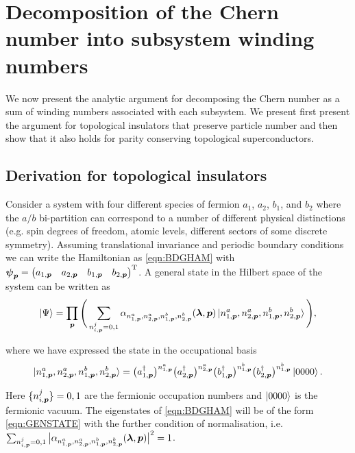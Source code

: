 \section{Decomposition of the Chern number into subsystem winding numbers}

We now present the analytic argument for decomposing the Chern number as a sum of winding numbers associated with each subsystem. We present first present the argument for topological insulators that preserve particle number and then show that it also holds for parity conserving topological superconductors.

\subsection{Derivation for topological insulators}

Consider a system with four different species of fermion $a_{1}$, $a_{2}$, $b_{1}$, and $b_{2}$ where the $a/b$ bi-partition can correspond to a number of different physical distinctions (e.g. spin degrees of freedom, atomic levels, different sectors of some discrete symmetry). Assuming translational invariance and periodic boundary conditions we can write the Hamiltonian as \eqref{eqn:BDGHAM} with $\boldsymbol{\psi}_{\boldsymbol{p}}=\begin{pmatrix} a_{1,\boldsymbol{p}} & a_{2,\boldsymbol{p}} & b_{1,\boldsymbol{p}} & b_{2,\boldsymbol{p}} \end{pmatrix} ^{\text{T}}$. A general state in the Hilbert space of the system can be written as
\begin{equation}\label{eqn:GENSTATE}
    \ket{\Psi}=\prod_{\boldsymbol{p}}\Bigg(\sum_{n^{j}_{i,\boldsymbol{p}}=0,1} \alpha_{n^{a}_{1,\boldsymbol{p}},n^{a}_{2,\boldsymbol{p}},n^{b}_{1,\boldsymbol{p}},n^{b}_{2,\boldsymbol{p}}}(\boldsymbol{\lambda},\boldsymbol{p})\ket{n^{a}_{1,\boldsymbol{p}},n^{a}_{2,\boldsymbol{p}},n^{b}_{1,\boldsymbol{p}},n^{b}_{2,\boldsymbol{p}}}\Bigg),
\end{equation}

\noi where we have expressed the state in the occupational basis
\begin{equation}\label{eqn:BASIS}
    \ket{n^{a}_{1,\boldsymbol{p}},n^{a}_{2,\boldsymbol{p}},n^{b}_{1,\boldsymbol{p}},n^{b}_{2,\boldsymbol{p}}}=\big(a^{\dagger}_{1,\boldsymbol{p}}\big)^{n^{a}_{1,\boldsymbol{p}}}\big(a^{\dagger}_{2,\boldsymbol{p}}\big)^{n^{a}_{2,\boldsymbol{p}}}\big(b^{\dagger}_{1,\boldsymbol{p}}\big)^{n^{b}_{1,\boldsymbol{p}}}\big(b^{\dagger}_{2,\boldsymbol{p}}\big)^{n^{b}_{1,\boldsymbol{p}}}\ket{0000}.
\end{equation}

\noi Here $\{n^{j}_{i,\boldsymbol{p}}\}=0,1$ are the fermionic occupation numbers and $\ket{0000}$ is the fermionic vacuum. The eigenstates of \eqref{eqn:BDGHAM} will be of the form \eqref{eqn:GENSTATE} with the further condition of normalisation, i.e. $\sum_{n^{j}_{i,\boldsymbol{p}}=0,1}\big|\alpha_{n^{a}_{1,\boldsymbol{p}},n^{a}_{2,\boldsymbol{p}},n^{b}_{1,\boldsymbol{p}},n^{b}_{2,\boldsymbol{p}}}(\boldsymbol{\lambda},\boldsymbol{p})\big|^{2}=1$.\\

